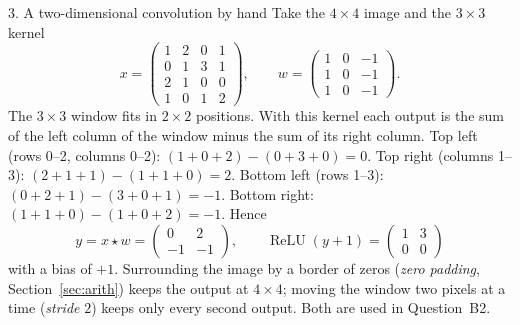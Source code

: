 \documentclass[11pt]{article}
\newcommand{\ReLU}{\operatorname{ReLU}}
\begin{document}
\begin{worked}{3. A two-dimensional convolution by hand}
Take the $4 \times 4$ image and the $3 \times 3$ kernel
\[
  x = \begin{pmatrix} 1 & 2 & 0 & 1 \\ 0 & 1 & 3 & 1 \\ 2 & 1 & 0 & 0 \\ 1 & 0 & 1 & 2 \end{pmatrix}, \qquad
  w = \begin{pmatrix} 1 & 0 & -1 \\ 1 & 0 & -1 \\ 1 & 0 & -1 \end{pmatrix}.
\]
The $3 \times 3$ window fits in $2 \times 2$ positions. With this kernel each output is the sum of the left column of the
window minus the sum of its right column. Top left (rows 0--2, columns 0--2): $(1 + 0 + 2) - (0 + 3 + 0) = 0$. Top right
(columns 1--3): $(2 + 1 + 1) - (1 + 1 + 0) = 2$. Bottom left (rows 1--3): $(0 + 2 + 1) - (3 + 0 + 1) = -1$. Bottom right:
$(1 + 1 + 0) - (1 + 0 + 2) = -1$. Hence
\[
  y = x \star w = \begin{pmatrix} 0 & 2 \\ -1 & -1 \end{pmatrix}, \qquad
  \ReLU(y + 1) = \begin{pmatrix} 1 & 3 \\ 0 & 0 \end{pmatrix}
\]
with a bias of $+1$. Surrounding the image by a border of zeros (\emph{zero padding}, Section~\ref{sec:arith}) keeps the
output at $4 \times 4$; moving the window two pixels at a time (\emph{stride} $2$) keeps only every second output. Both
are used in Question~B2.


\end{worked}
\end{document}
